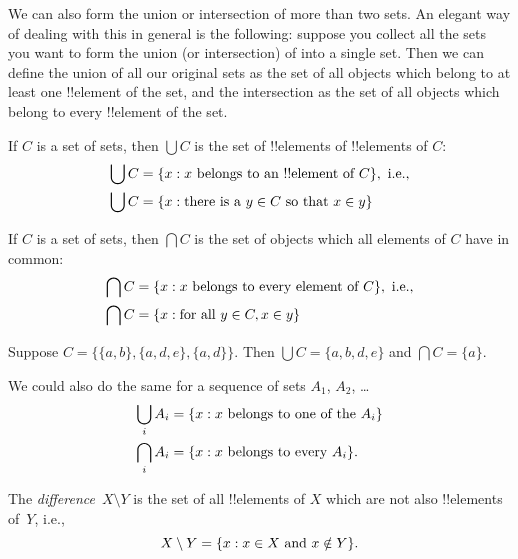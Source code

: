 \documentclass[../../../include/open-logic-section]{subfiles}
\begin{document}
\begin{explain}
We can also form the union or intersection of more than two
sets. An elegant way of dealing with this in general is the
following: suppose you collect all the sets you want to form the union
(or intersection) of into a single set. Then we can define the union
of all our original sets as the set of all objects which belong to at
least one !!{element} of the set, and the intersection as the set of
all objects which belong to every !!{element} of the set.
\end{explain}

\begin{defn}
If $C$ is a set of sets, then $\bigcup C$ is the set of !!{element}s of
!!{element}s of $C$:
\begin{align*}
\bigcup C & = \Setabs{x}{x \text{ belongs to an !!{element} of } C},
\text{ i.e.,}\\
\bigcup C & = \Setabs{x}{\text{there is a } y \in C
  \text{ so that } x \in y}
\end{align*}
\end{defn}

\begin{defn}
If $C$ is a set of sets, then $\bigcap C$ is the set of objects which
all elements of $C$ have in common:
\begin{align*}
\bigcap C & = \Setabs{x}{x \text{ belongs to every element of } C},
\text{ i.e.,}\\
\bigcap C & = \Setabs{x}{\text{for all } y \in C, x \in y}
\end{align*}
\end{defn}

\begin{ex}
Suppose $C = \{ \{ a, b \}, \{ a, d, e \}, \{ a, d \} \}$.
Then $\bigcup C = \{ a, b, d, e \}$ and $\bigcap C = \{ a \}$.
\end{ex}

We could also do the same for a sequence of sets $A_1$, $A_2$, \dots
\begin{align*}
\bigcup_i A_i & = \Setabs{x}{x \text{ belongs to one of the } A_i}\\
\bigcap_i A_i & = \Setabs{x}{x \text{ belongs to every } A_i}.
\end{align*}

\begin{defn}[Difference]
The \emph{difference}~$X \setminus Y$ is the set of all !!{element}s of
$X$ which are not also !!{element}s of~$Y$, i.e.,
\[
X\setminus Y = \{ x : x\in X \text{ and } x \notin Y \}.
\]
\end{defn}
\end{document}
